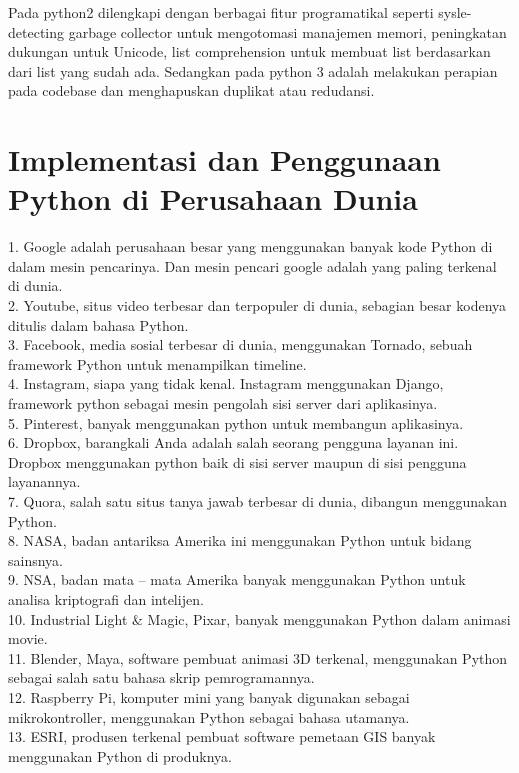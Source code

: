 \documentclass[lipt]{Article}
\begin{document}
Pada python2 dilengkapi dengan berbagai fitur programatikal seperti sysle-detecting garbage collector untuk mengotomasi manajemen memori, peningkatan dukungan untuk Unicode, list comprehension untuk membuat list berdasarkan dari list yang sudah ada. Sedangkan pada python 3 adalah melakukan perapian pada codebase dan menghapuskan duplikat atau redudansi.

\section{Implementasi dan Penggunaan Python di Perusahaan Dunia}
1.	Google adalah perusahaan besar yang menggunakan banyak kode Python di dalam mesin pencarinya. Dan mesin pencari google adalah yang paling terkenal di dunia.\\
2.	Youtube, situs video terbesar dan terpopuler di dunia, sebagian besar kodenya ditulis dalam bahasa Python.\\
3.	Facebook, media sosial terbesar di dunia, menggunakan Tornado, sebuah framework Python untuk menampilkan timeline.\\
4.	Instagram, siapa yang tidak kenal. Instagram menggunakan Django, framework python sebagai mesin pengolah sisi server dari aplikasinya.\\
5.	Pinterest, banyak menggunakan python untuk membangun aplikasinya.\\
6.	Dropbox, barangkali Anda adalah salah seorang pengguna layanan ini. Dropbox menggunakan python baik di sisi server maupun di sisi pengguna layanannya.\\
7.	Quora, salah satu situs tanya jawab terbesar di dunia, dibangun menggunakan Python.\\
8.	NASA, badan antariksa Amerika ini menggunakan Python untuk bidang sainsnya.\\
9.	NSA, badan mata – mata Amerika banyak menggunakan Python untuk analisa kriptografi dan intelijen.\\
10.	Industrial Light & Magic, Pixar, banyak menggunakan Python dalam animasi movie.\\
11.	Blender, Maya, software pembuat animasi 3D terkenal, menggunakan Python sebagai salah satu bahasa skrip pemrogramannya.\\
12.	Raspberry Pi, komputer mini yang banyak digunakan sebagai mikrokontroller, menggunakan Python sebagai bahasa utamanya.\\
13.	ESRI, produsen terkenal pembuat software pemetaan GIS banyak menggunakan Python di produknya.\\
\end{document}
